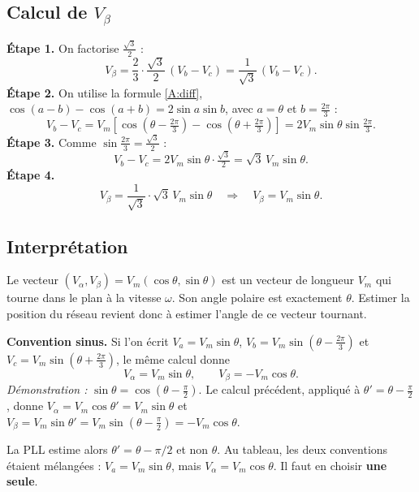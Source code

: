 \documentclass[11pt,a4paper]{article}
\numberwithin{equation}{section}
\theoremstyle{plain}
\theoremstyle{definition}
\theoremstyle{remark}
\begin{document}
\subsection{Calcul de $V_\beta$}
\textbf{Étape 1.} On factorise $\frac{\sqrt3}{2}$ :
\begin{equation}
V_\beta = \frac23\cdot\frac{\sqrt3}{2}\,(V_b-V_c) = \frac{1}{\sqrt3}\,(V_b-V_c).
\end{equation}
\textbf{Étape 2.} On utilise la formule \eqref{A:diff}, $\cos(a-b)-\cos(a+b) = 2\sin a\sin b$,
avec $a=\theta$ et $b=\tfrac{2\pi}{3}$ :
\begin{equation}
V_b-V_c = V_m\left[\cos\!\left(\theta-\tfrac{2\pi}{3}\right)-\cos\!\left(\theta+\tfrac{2\pi}{3}\right)\right]
= 2V_m\sin\theta\sin\tfrac{2\pi}{3}.
\end{equation}
\textbf{Étape 3.} Comme $\sin\tfrac{2\pi}{3}=\tfrac{\sqrt3}{2}$ :
\begin{equation}
V_b-V_c = 2V_m\sin\theta\cdot\tfrac{\sqrt3}{2} = \sqrt3\,V_m\sin\theta .
\end{equation}
\textbf{Étape 4.}
\begin{equation}\label{eq:vbeta}
V_\beta = \frac{1}{\sqrt3}\cdot\sqrt3\,V_m\sin\theta \quad\Longrightarrow\quad \boxed{V_\beta = V_m\sin\theta.}
\end{equation}

\subsection{Interprétation}\label{sec:conv}
Le vecteur $(V_\alpha,V_\beta) = V_m(\cos\theta,\sin\theta)$ est un vecteur de longueur $V_m$
qui tourne dans le plan à la vitesse $\omega$. Son angle polaire est exactement $\theta$.
Estimer la position du réseau revient donc à estimer l'angle de ce vecteur tournant.

\begin{attention}
\textbf{Convention sinus.} Si l'on écrit $V_a=V_m\sin\theta$, $V_b=V_m\sin(\theta-\frac{2\pi}{3})$
et $V_c=V_m\sin(\theta+\frac{2\pi}{3})$, le même calcul donne
\[
V_\alpha = V_m\sin\theta,\qquad V_\beta = -V_m\cos\theta .
\]
\emph{Démonstration :} $\sin\theta = \cos(\theta-\frac{\pi}{2})$. Le calcul précédent, appliqué à
$\theta'=\theta-\frac\pi2$, donne $V_\alpha=V_m\cos\theta'=V_m\sin\theta$ et
$V_\beta=V_m\sin\theta'=V_m\sin(\theta-\frac\pi2)=-V_m\cos\theta$.

La PLL estime alors $\theta' = \theta-\pi/2$ et non $\theta$. Au tableau, les deux conventions étaient
mélangées : $V_a=V_m\sin\theta$, mais $V_\alpha=V_m\cos\theta$. Il faut en choisir \textbf{une seule}.
\end{attention}
\end{document}
